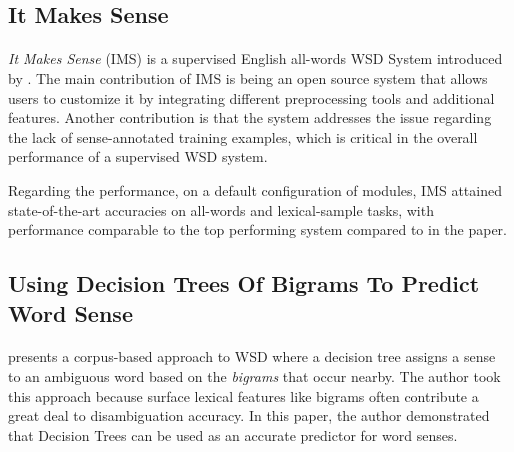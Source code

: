 \documentclass[a4paper,12pt]{nurop}
\begin{document}
\subsection{It Makes Sense}
\paragraph{}
\textit{It Makes Sense} (IMS) is a supervised English all-words WSD System introduced by \cite{itmakessense}. The main contribution of IMS is being an open source system that allows users to customize it by integrating different preprocessing tools and additional features. Another contribution is that the system addresses the issue regarding the lack of sense-annotated training examples, which is critical in the overall performance of a supervised WSD system.

Regarding the performance, on a default configuration of modules, IMS attained state-of-the-art accuracies on all-words and lexical-sample tasks, with performance comparable to the top performing system compared to in the paper.

\subsection{Using Decision Trees Of Bigrams To Predict Word Sense}
\paragraph{}
\cite{pederson} presents a corpus-based approach to WSD where a decision tree assigns a sense to an ambiguous word based on the \textit{bigrams} that occur nearby. The author took this approach because surface lexical features like bigrams often contribute a great deal to disambiguation accuracy. In this paper, the author demonstrated that Decision Trees can be used as an accurate predictor for word senses.

\end{document}
